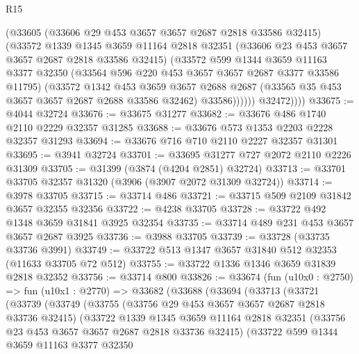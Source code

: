 \begin{lexlean}{R15}
\begin{coremodule}
                (@33605
                  (@33606 @29 @453 @3657 @3657 @2687 @2818 @33586 @32415)
                  (@33572
                    @1339
                    @1345
                    @3659
                    @11164
                    @2818
                    @32351
                    (@33606 @23 @453 @3657 @3657 @2687 @2818 @33586 @32415)
                    (@33572
                      @599
                      @1344
                      @3659
                      @11163
                      @3377
                      @32350
                      (@33564 @596 @220 @453 @3657 @3657 @2687 @3377 @33586 @11795)
                      (@33572
                        @1342
                        @453
                        @3659
                        @3657
                        @2688
                        @2687
                        (@33565 @35 @453 @3657 @3657 @2687 @2688 @33586 @32462)
                        @33586))))))
            @32472))))
@33675 := @4044 @32724
@33676 := @33675 @31277
@33682 := @33676 @486 @1740 @2110 @2229 @32357 @31285
@33688 := @33676 @573 @1353 @2203 @2228 @32357 @31293
@33694 := @33676 @716 @710 @2110 @2227 @32357 @31301
@33695 := @3941 @32724
@33701 := @33695 @31277 @727 @2072 @2110 @2226 @31309
@33705 := @31399 (@3874 (@4204 @2851) @32724)
@33713 := @33701 @33705 @32357 @31320 (@3906 (@3907 @2072 @31309 @32724))
@33714 := @3978 @33705
@33715 := @33714 @486
@33721 := @33715 @509 @2109 @31842 @3657 @32355 @32356
@33722 := @4238 @33705
@33728 := @33722 @492 @1348 @3659 @31841 @3925 @32354
@33735 := @33714 @489 @231 @453 @3657 @3657 @2687 @3925
@33736 := @3988 @33705
@33739 := @33728 (@33735 @33736 @3991)
@33749 := @33722 @513 @1347 @3657 @31840 @512 @32353 (@11633 @33705 @72 @512)
@33755 := @33722 @1336 @1346 @3659 @31839 @2818 @32352
@33756 := @33714 @800
@33826 := @33674
    (fun (u10x0 : @2750) =>
    fun (u10x1 : @2770) =>
    @33682
      (@33688
        (@33694
          (@33713
            (@33721
              (@33739
                (@33749
                  (@33755
                    (@33756 @29 @453 @3657 @3657 @2687 @2818 @33736 @32415)
                    (@33722
                      @1339
                      @1345
                      @3659
                      @11164
                      @2818
                      @32351
                      (@33756 @23 @453 @3657 @3657 @2687 @2818 @33736 @32415)
                      (@33722
                        @599
                        @1344
                        @3659
                        @11163
                        @3377
                        @32350

\end{coremodule}
\end{lexlean}
